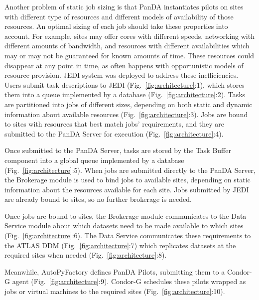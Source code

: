 
Another problem of static job sizing is that PanDA instantiates pilots on
sites with different type of resources and different models of availability
of those resources. An optimal sizing of each job should take these
properties into account. For example, sites may offer cores with different
speeds, networking with different amounts of bandwidth, and resources with
different availabilities which may or may not be guaranteed for known amounts
of time. These resources could disappear at any point in time, as often
happens with opportunistic models of resource provision. JEDI system was
deployed to address these inefficiencies. Users submit task descriptions to
JEDI (Fig.~\ref{fig:architecture}:1), which stores them into a queue
implemented by a database (Fig.~\ref{fig:architecture}:2). Tasks are
partitioned into jobs of different sizes, depending on both static and
dynamic information about available resources
(Fig.~\ref{fig:architecture}:3). Jobs are bound to sites with resources that
best match jobs' requirements, and they are submitted to the PanDA Server for
execution (Fig.~\ref{fig:architecture}:4).

Once submitted to the PanDA Server, tasks are stored by the Task Buffer
component into a global queue implemented by a database
(Fig.~\ref{fig:architecture}:5). When jobs are submitted directly to the
PanDA Server, the Brokerage module is used to bind jobs to available sites,
depending on static information about the resources available for each site.
Jobs submitted by JEDI are already bound to sites, so no further brokerage is
needed.

Once jobs are bound to sites, the Brokerage module communicates to the Data
Service module about which datasets need to be made available to which sites
(Fig.~\ref{fig:architecture}:6). The Data Service communicates these
requirements to the ATLAS DDM (Fig.~\ref{fig:architecture}:7) which
replicates datasets at the required sites when needed
(Fig.~\ref{fig:architecture}:8).

Meanwhile, AutoPyFactory defines PanDA Pilots, submitting them to a Condor-G
agent (Fig.~\ref{fig:architecture}:9). Condor-G schedules these pilots
wrapped as jobs or virtual machines to the required sites
(Fig.~\ref{fig:architecture}:10).

